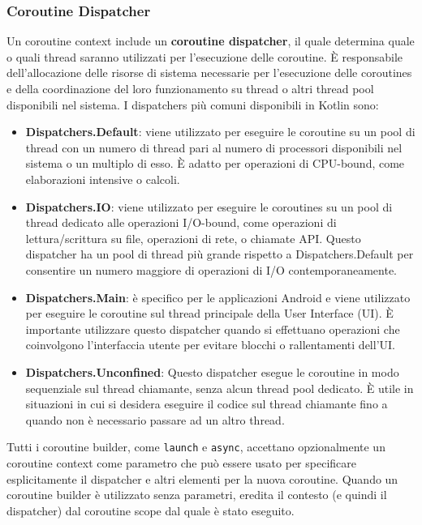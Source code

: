 \documentclass[12pt,a4paper,openright,twoside]{book}
\begin{document}


\subsubsection{Coroutine Dispatcher}
Un coroutine context include un \textbf{coroutine dispatcher}, il quale determina quale o quali thread saranno utilizzati per l'esecuzione delle coroutine. È responsabile dell'allocazione delle risorse di sistema necessarie per l'esecuzione delle coroutines e della coordinazione del loro funzionamento su thread o altri thread pool disponibili nel sistema.
I dispatchers più comuni disponibili in Kotlin sono: 
\begin{itemize}
    \item \textbf{Dispatchers.Default}: viene utilizzato per eseguire le coroutine su un pool di thread con un numero di thread pari al numero di processori disponibili nel sistema o un multiplo di esso. È adatto per operazioni di CPU-bound, come elaborazioni intensive o calcoli.
    \item \textbf{Dispatchers.IO}:  viene utilizzato per eseguire le coroutines su un pool di thread dedicato alle operazioni I/O-bound, come operazioni di lettura/scrittura su file, operazioni di rete, o chiamate API. Questo dispatcher ha un pool di thread più grande rispetto a Dispatchers.Default per consentire un numero maggiore di operazioni di I/O contemporaneamente.
    \item \textbf{Dispatchers.Main}: è specifico per le applicazioni Android e viene utilizzato per eseguire le coroutine sul thread principale della User Interface (UI). È importante utilizzare questo dispatcher quando si effettuano operazioni che coinvolgono l'interfaccia utente per evitare blocchi o rallentamenti dell'UI.
    \item \textbf{Dispatchers.Unconfined}: Questo dispatcher esegue le coroutine in modo sequenziale sul thread chiamante, senza alcun thread pool dedicato. È utile in situazioni in cui si desidera eseguire il codice sul  thread chiamante fino a quando non è necessario passare ad un altro thread.
\end{itemize}
Tutti i coroutine builder, come \texttt{launch} e \texttt{async}, accettano opzionalmente un coroutine context come parametro che può essere usato per specificare esplicitamente il dispatcher e altri elementi per la nuova coroutine. 
Quando un coroutine builder è utilizzato senza parametri, eredita il contesto (e quindi il dispatcher) dal coroutine scope dal quale è stato eseguito. 
\end{document}
